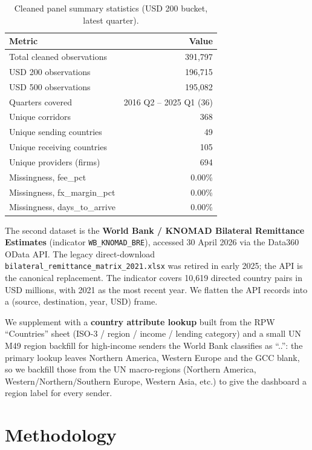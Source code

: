 \documentclass[
  11pt,
]{article}
\begin{document}
\begin{table}[h]
\centering
\caption{Cleaned panel summary statistics (USD 200 bucket, latest quarter).}
\begin{tabular}{lr}
\toprule
\textbf{Metric} & \textbf{Value} \\
\midrule
Total cleaned observations & 391{,}797 \\
USD 200 observations & 196{,}715 \\
USD 500 observations & 195{,}082 \\
Quarters covered & 2016 Q2 -- 2025 Q1 (36) \\
Unique corridors & 368 \\
Unique sending countries & 49 \\
Unique receiving countries & 105 \\
Unique providers (firms) & 694 \\
Missingness, fee\_pct & 0.00\% \\
Missingness, fx\_margin\_pct & 0.00\% \\
Missingness, days\_to\_arrive & 0.00\% \\
\bottomrule
\end{tabular}
\end{table}

The second dataset is the \textbf{World Bank / KNOMAD Bilateral
Remittance Estimates} (indicator \texttt{WB\_KNOMAD\_BRE}), accessed 30
April 2026 via the Data360 OData API. The legacy direct-download
\texttt{bilateral\_remittance\_matrix\_2021.xlsx} was retired in early
2025; the API is the canonical replacement. The indicator covers 10,619
directed country pairs in USD millions, with 2021 as the most recent
year. We flatten the API records into a (source, destination, year, USD)
frame.

We supplement with a \textbf{country attribute lookup} built from the
RPW ``Countries'' sheet (ISO-3 / region / income / lending category) and
a small UN M49 region backfill for high-income senders the World Bank
classifies as ``..'': the primary lookup leaves Northern America,
Western Europe and the GCC blank, so we backfill those from the UN
macro-regions (Northern America, Western/Northern/Southern Europe,
Western Asia, etc.) to give the dashboard a region label for every
sender.

\section{Methodology}\label{methodology}
\end{document}
